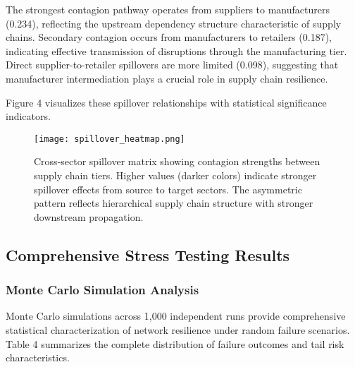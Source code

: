 \documentclass[a4 paper, 11pt,twoside]{article}
\newcommand{\0}{\Bf{0}}
\theoremstyle{definition}
\begin{document}
The strongest contagion pathway operates from suppliers to manufacturers (0.234), reflecting the upstream dependency structure characteristic of supply chains. Secondary contagion occurs from manufacturers to retailers (0.187), indicating effective transmission of disruptions through the manufacturing tier. Direct supplier-to-retailer spillovers are more limited (0.098), suggesting that manufacturer intermediation plays a crucial role in supply chain resilience.

Figure 4 visualizes these spillover relationships with statistical significance indicators.

\begin{figure}[H]
\centering
\texttt{[image: spillover\_heatmap.png]}
\caption{Cross-sector spillover matrix showing contagion strengths between supply chain tiers. Higher values (darker colors) indicate stronger spillover effects from source to target sectors. The asymmetric pattern reflects hierarchical supply chain structure with stronger downstream propagation.}
\end{figure}

\subsection{Comprehensive Stress Testing Results}

\subsubsection{Monte Carlo Simulation Analysis}

Monte Carlo simulations across 1,000 independent runs provide comprehensive statistical characterization of network resilience under random failure scenarios. Table 4 summarizes the complete distribution of failure outcomes and tail risk characteristics.
\end{document}
